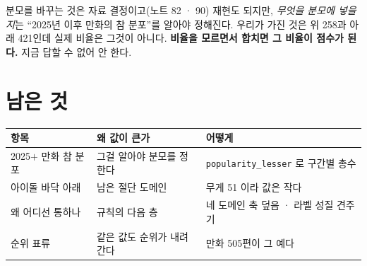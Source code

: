 \documentclass[11pt]{article}
\begin{document}
분모를 바꾸는 것은 자료 결정이고(노트 82 · 90) 재현도 되지만, \emph{무엇을
분모에 넣을지}는 ``2025년 이후 만화의 참 분포''를 알아야 정해진다. 우리가
가진 것은 위 258과 아래 421인데 실제 비율은 그것이 아니다. \textbf{비율을
모르면서 합치면 그 비율이 점수가 된다.} 지금 답할 수 없어 안 한다.

\section{남은 것}

\begin{center}
\begin{tabular}{lll}
\hline
항목 & 왜 값이 큰가 & 어떻게 \\
\hline
2025$+$ 만화 참 분포 & 그걸 알아야 분모를 정한다 & \texttt{popularity\_lesser} 로 구간별 총수 \\
아이돌 바닥 아래 & 남은 절단 도메인 & 무게 51 이라 값은 작다 \\
왜 어디선 통하나 & 규칙의 다음 층 & 네 도메인 축 덮음 · 라벨 성질 견주기 \\
순위 표류 & 같은 값도 순위가 내려간다 & 만화 505편이 그 예다 \\
\hline
\end{tabular}
\end{center}
\end{document}
